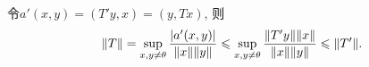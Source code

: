 \documentclass[12pt,a4paper,oneside]{ctexart}
\begin{document}
    令$a'(x,y)=(T'y,x)=(y,Tx)$, 则
    $$\norm{T}=\sup_{x,y\neq\theta}\frac{\abs{a'(x,y)}}{\norm{x}\norm{y}}\leqslant\sup_{x,y\neq\theta}\frac{\norm{T'y}\norm{x}}{\norm{x}\norm{y}}\leqslant\norm{T'}. $$
\end{document}
